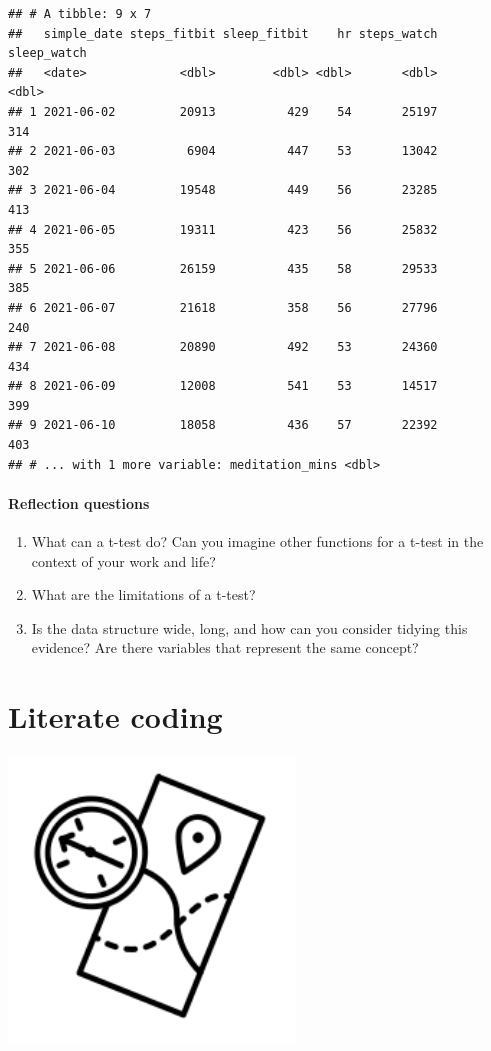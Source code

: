 \documentclass[
]{book}
\providecommand{\tightlist}{%
  \setlength{\itemsep}{0pt}\setlength{\parskip}{0pt}}
\begin{document}
\begin{verbatim}
## # A tibble: 9 x 7
##   simple_date steps_fitbit sleep_fitbit    hr steps_watch sleep_watch
##   <date>             <dbl>        <dbl> <dbl>       <dbl>       <dbl>
## 1 2021-06-02         20913          429    54       25197         314
## 2 2021-06-03          6904          447    53       13042         302
## 3 2021-06-04         19548          449    56       23285         413
## 4 2021-06-05         19311          423    56       25832         355
## 5 2021-06-06         26159          435    58       29533         385
## 6 2021-06-07         21618          358    56       27796         240
## 7 2021-06-08         20890          492    53       24360         434
## 8 2021-06-09         12008          541    53       14517         399
## 9 2021-06-10         18058          436    57       22392         403
## # ... with 1 more variable: meditation_mins <dbl>
\end{verbatim}

\hypertarget{reflection-questions}{%
\subsubsection*{Reflection questions}\label{reflection-questions}}

\begin{enumerate}
\def\labelenumi{\arabic{enumi}.}
\tightlist
\item
  What can a t-test do? Can you imagine other functions for a t-test in the context of your work and life?
\item
  What are the limitations of a t-test?
\item
  Is the data structure wide, long, and how can you consider tidying this evidence? Are there variables that represent the same concept?
\end{enumerate}

\hypertarget{coding}{%
\chapter{Literate coding}\label{coding}}

\includegraphics[width=3in,height=\textheight]{./coding.png}
\end{document}
